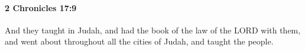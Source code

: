 
		\paragraph{2 Chronicles 17:9} %
			\label{2CHRONICLES-17-9}

			And they taught in Judah, and had the book of the law of the LORD with them, and went about throughout all the cities of Judah, and taught the people.


